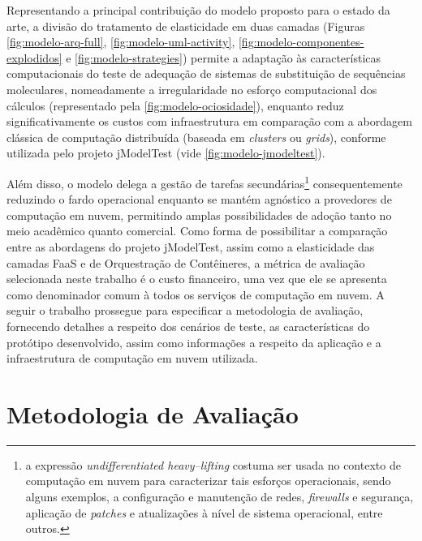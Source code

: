 \documentclass[english,brazilian]{UNISINOSmonografia} %
\begin{document}
Representando a principal contribuição do modelo proposto para o estado da arte, a divisão do tratamento de elasticidade em duas camadas (Figuras \ref{fig:modelo-arq-full}, \ref{fig:modelo-uml-activity}, \ref{fig:modelo-componentes-explodidos} e \ref{fig:modelo-strategies}) permite a adaptação às características computacionais do teste de adequação de sistemas de substituição de sequências moleculares, nomeadamente a irregularidade no esforço computacional dos cálculos (representado pela \autoref{fig:modelo-ociosidade}), enquanto reduz significativamente os custos com infraestrutura em comparação com a abordagem clássica de computação distribuída (baseada em \textit{clusters} ou \textit{grids}), conforme utilizada pelo projeto jModelTest (vide \autoref{fig:modelo-jmodeltest}).



Além disso, o modelo delega a gestão de tarefas secundárias\footnote{
	a expressão \textit{undifferentiated heavy--lifting} costuma ser usada no contexto de computação em nuvem para caracterizar tais esforços operacionais, sendo alguns exemplos, a configuração e manutenção de redes, \textit{firewalls} e segurança, aplicação de \textit{patches} e atualizações à nível de sistema operacional, entre outros.
} consequentemente reduzindo o fardo operacional enquanto se mantém agnóstico a provedores de computação em nuvem, permitindo amplas possibilidades de adoção tanto no meio acadêmico quanto comercial.
%
Como forma de possibilitar a comparação entre as abordagens do projeto jModelTest, assim como a elasticidade das camadas FaaS e de Orquestração de Contêineres, a métrica de avaliação selecionada neste trabalho é o custo financeiro, uma vez que ele se apresenta como denominador comum à todos os serviços de computação em nuvem.
%
A seguir o trabalho prossegue para especificar a metodologia de avaliação, fornecendo detalhes a respeito dos cenários de teste, as características do protótipo desenvolvido, assim como informações a respeito da aplicação e a infraestrutura de computação em nuvem utilizada.











\chapter{Metodologia de Avaliação}
\label{ch:modelo-metodologia}
\end{document}
